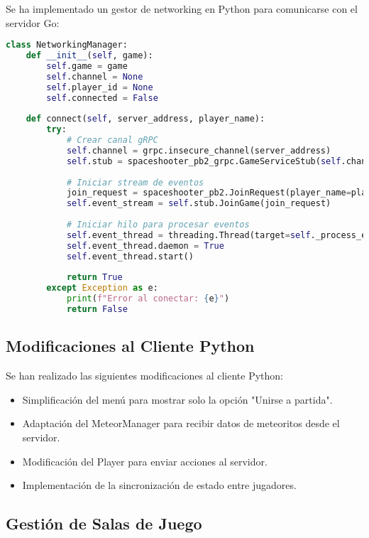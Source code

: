 \documentclass[12pt,letterpaper]{article}
\begin{document}
Se ha implementado un gestor de networking en Python para comunicarse con el servidor Go:

\begin{lstlisting}[language=python, caption=Ejemplo del NetworkingManager en Python]
class NetworkingManager:
    def __init__(self, game):
        self.game = game
        self.channel = None
        self.player_id = None
        self.connected = False
        
    def connect(self, server_address, player_name):
        try:
            # Crear canal gRPC
            self.channel = grpc.insecure_channel(server_address)
            self.stub = spaceshooter_pb2_grpc.GameServiceStub(self.channel)
            
            # Iniciar stream de eventos
            join_request = spaceshooter_pb2.JoinRequest(player_name=player_name)
            self.event_stream = self.stub.JoinGame(join_request)
            
            # Iniciar hilo para procesar eventos
            self.event_thread = threading.Thread(target=self._process_events)
            self.event_thread.daemon = True
            self.event_thread.start()
            
            return True
        except Exception as e:
            print(f"Error al conectar: {e}")
            return False
\end{lstlisting}

\subsection{Modificaciones al Cliente Python}

Se han realizado las siguientes modificaciones al cliente Python:

\begin{itemize}
    \item Simplificación del menú para mostrar solo la opción "Unirse a partida".
    \item Adaptación del MeteorManager para recibir datos de meteoritos desde el servidor.
    \item Modificación del Player para enviar acciones al servidor.
    \item Implementación de la sincronización de estado entre jugadores.
\end{itemize}

\subsection{Gestión de Salas de Juego}
\end{document}
